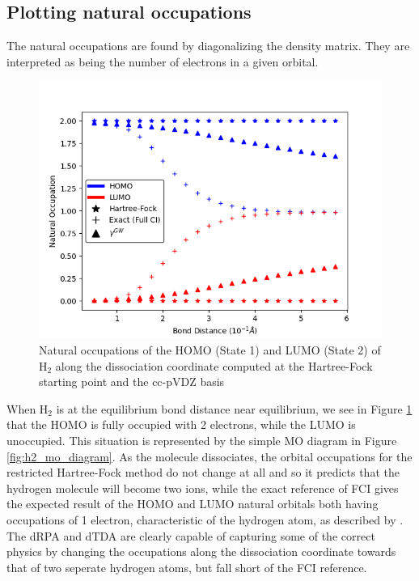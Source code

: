 \documentclass[12pt]{caltech_thesis}
\begin{document}
\subsection{Plotting natural occupations}
The natural occupations are found by diagonalizing the density matrix. They are interpreted as being the number of electrons in a given orbital.\autocite{szabo_modern_2012}
\begin{figure}[h]
    \centering
    \includegraphics[width=\textwidth]{h2_occupations.png}
\caption{Natural occupations of the HOMO (State 1) and LUMO (State 2) of $\mathrm{H_2}$ along the dissociation coordinate computed at the Hartree-Fock starting point and the cc-pVDZ basis}
\label{fig:h2_dissociation}
\end{figure}
When $\mathrm{H_2}$ is at the equilibrium bond distance near equilibrium, we see in Figure \ref{fig:h2_dissociation} that the HOMO is fully occupied with 2 electrons, while the LUMO is unoccupied. This situation is represented by the simple MO diagram in Figure \ref{fig:h2_mo_diagram}. As the molecule dissociates, the orbital occupations for the restricted Hartree-Fock method do not change at all and so it predicts that the hydrogen molecule will become two ions, while the exact reference of FCI gives the expected result of the HOMO and LUMO natural orbitals both having occupations of 1 electron, characteristic of the hydrogen atom, as described by \textcite{bruneval_improved_2021}. The dRPA and dTDA are clearly capable of capturing some of the correct physics by changing the occupations along the dissociation coordinate towards that of two seperate hydrogen atoms, but fall short of the FCI reference.
\end{document}
